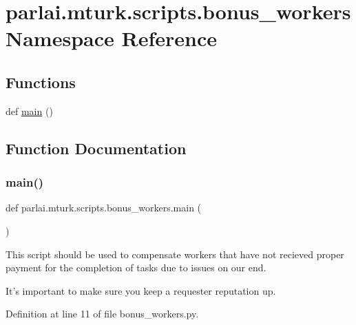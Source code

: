 \hypertarget{namespaceparlai_1_1mturk_1_1scripts_1_1bonus__workers}{}\section{parlai.\+mturk.\+scripts.\+bonus\+\_\+workers Namespace Reference}
\label{namespaceparlai_1_1mturk_1_1scripts_1_1bonus__workers}
\subsection*{Functions}
\begin{DoxyCompactItemize}
\item 
def \hyperlink{namespaceparlai_1_1mturk_1_1scripts_1_1bonus__workers_aafc7a350f4abb5524c1b7477b3fc2bda}{main} ()
\end{DoxyCompactItemize}


\subsection{Function Documentation}
\mbox{\label{namespaceparlai_1_1mturk_1_1scripts_1_1bonus__workers_aafc7a350f4abb5524c1b7477b3fc2bda}} 
\subsubsection{\texorpdfstring{main()}{main()}}
{\footnotesize\ttfamily def parlai.\+mturk.\+scripts.\+bonus\+\_\+workers.\+main (\begin{DoxyParamCaption}{ }\end{DoxyParamCaption})}

\begin{DoxyVerb}This script should be used to compensate workers that have not recieved proper
payment for the completion of tasks due to issues on our end.

It's important to make sure you keep a requester reputation up.
\end{DoxyVerb}
 

Definition at line 11 of file bonus\+\_\+workers.\+py.


